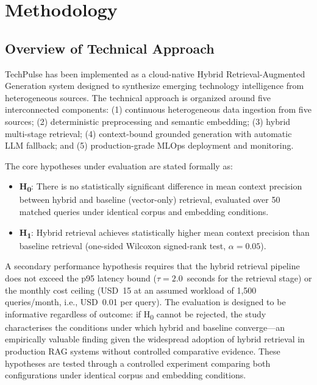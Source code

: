 \chapter{Methodology}

\section{Overview of Technical Approach}
\label{sec:method_overview}

TechPulse has been implemented as a cloud-native Hybrid Retrieval-Augmented Generation system designed to synthesize emerging technology intelligence from heterogeneous sources. The technical approach is organized around five interconnected components: (1) continuous heterogeneous data ingestion from five sources; (2) deterministic preprocessing and semantic embedding; (3) hybrid multi-stage retrieval; (4) context-bound grounded generation with automatic LLM fallback; and (5) production-grade MLOps deployment and monitoring.

The core hypotheses under evaluation are stated formally as:

\begin{itemize}[leftmargin=0.5in]
  \item \textbf{H\textsubscript{0}}: There is no statistically significant difference in mean context precision between hybrid and baseline (vector-only) retrieval, evaluated over 50 matched queries under identical corpus and embedding conditions.
  \item \textbf{H\textsubscript{1}}: Hybrid retrieval achieves statistically higher mean context precision than baseline retrieval (one-sided Wilcoxon signed-rank test, $\alpha = 0.05$).
\end{itemize}

A secondary performance hypothesis requires that the hybrid retrieval pipeline does not exceed the p95 latency bound ($\tau = 2.0$~seconds for the retrieval stage) or the monthly cost ceiling (USD~15 at an assumed workload of 1,500 queries/month, i.e., USD~0.01 per query). The evaluation is designed to be informative regardless of outcome: if H\textsubscript{0} cannot be rejected, the study characterises the conditions under which hybrid and baseline converge---an empirically valuable finding given the widespread adoption of hybrid retrieval in production RAG systems without controlled comparative evidence. These hypotheses are tested through a controlled experiment comparing both configurations under identical corpus and embedding conditions.


